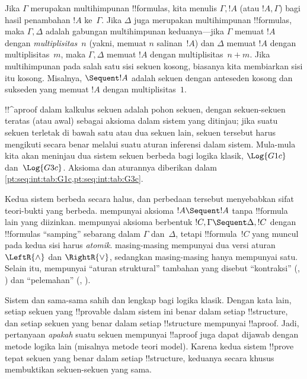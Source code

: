 \documentclass[../../../include/open-logic-section]{subfiles}
\begin{document}
Jika $\Gamma$ merupakan multihimpunan !!{formula}s, kita menulis
$\Gamma,!A$ (atau $!A,\Gamma$) bagi hasil penambahan $!A$ ke~$\Gamma$.
Jika $\Delta$ juga merupakan multihimpunan !!{formula}s, maka
$\Gamma,\Delta$ adalah gabungan multihimpunan keduanya---jika $\Gamma$
memuat $!A$ dengan \emph{multiplisitas}~$n$ (yakni, memuat $n$ salinan~$!A$)
dan $\Delta$ memuat $!A$ dengan multiplisitas~$m$, maka $\Gamma,\Delta$
memuat $!A$ dengan multiplisitas~$n+m$. Jika multihimpunan pada salah satu
sisi sekuen kosong, biasanya kita membiarkan sisi itu kosong. Misalnya,
$\Sequent !A$ adalah sekuen dengan anteseden kosong dan sukseden yang memuat
$!A$ dengan multiplisitas~$1$.

!!^a{proof} dalam kalkulus sekuen adalah pohon sekuen, dengan sekuen-sekuen
teratas (atau awal) sebagai aksioma dalam sistem yang ditinjau; jika suatu
sekuen terletak di bawah satu atau dua sekuen lain, sekuen tersebut harus
mengikuti secara benar melalui suatu aturan inferensi dalam sistem. Mula-mula
kita akan meninjau dua sistem sekuen berbeda bagi logika klasik,
$\Log{G1c}$ dan~$\Log{G3c}$. Aksioma dan aturannya diberikan dalam
\cref{pt:seq:int:tab:G1c,pt:seq:int:tab:G3c}.




Kedua sistem berbeda secara halus, dan perbedaan tersebut menyebabkan sifat
teori-bukti yang berbeda.  mempunyai aksioma $!A\Sequent !A$ tanpa
!!{formula} lain yang diizinkan.  mempunyai aksioma berbentuk
$!C,\Gamma\Sequent\Delta,!C$ dengan !!{formula}s ``samping'' sebarang dalam
$\Gamma$ dan~$\Delta$, tetapi !!{formula}~$!C$ yang muncul pada kedua sisi
harus \emph{atomik}.  masing-masing mempunyai dua versi aturan
$\LeftR{\land}$ dan $\RightR{\lor}$, sedangkan  masing-masing hanya
mempunyai satu. Selain itu,  mempunyai ``aturan struktural''
tambahan yang disebut ``kontraksi''
(\LeftR{\Contraction}, \RightR{\Contraction}) dan ``pelemahan''
(\LeftR{\Weakening}, \RightR{\Weakening}).

Sistem  dan  sama-sama sahih dan lengkap bagi logika
klasik. Dengan kata lain, setiap sekuen yang !!{provable} dalam sistem ini
benar dalam setiap !!{structure}, dan setiap sekuen yang benar dalam setiap
!!{structure} mempunyai !!a{proof}. Jadi, pertanyaan \emph{apakah} suatu
sekuen mempunyai !!a{proof} juga dapat dijawab dengan metode logika lain
(misalnya metode teori model). Karena kedua sistem !!{prove} tepat sekuen
yang benar dalam setiap !!{structure}, keduanya secara khusus membuktikan
sekuen-sekuen yang sama.
\end{document}
